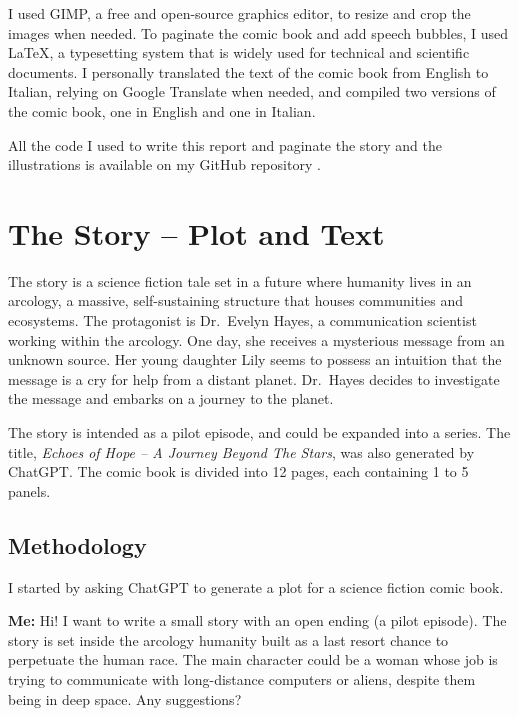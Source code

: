 \documentclass[a4paper,11pt]{article}
\newenvironment{shadedquotation1}
    {\colorlet{shadecolor}{JungleGreen!15}\begin{shaded*}
    \quoting[leftmargin=0cm, rightmargin=0cm, vskip=0pt]
    }
    {\endquoting
    \end{shaded*}
}
\begin{document}
I used GIMP, a free and open-source graphics editor, to resize and crop the images when needed. To paginate the comic book and add speech bubbles, I used \LaTeX, a typesetting system that is widely used for technical and scientific documents. I personally translated the text of the comic book from English to Italian, relying on Google Translate when needed, and compiled two versions of the comic book, one in English and one in Italian. 

All the code I used to write this report and paginate the story and the illustrations is available on my GitHub repository \cite{github}.



\section{The Story -- Plot and Text}

The story is a science fiction tale set in a future where humanity lives in an arcology, a massive, self-sustaining structure that houses communities and ecosystems. The protagonist is Dr.~Evelyn Hayes, a communication scientist working within the arcology. One day, she receives a mysterious message from an unknown source. Her young daughter Lily seems to possess an intuition that the message is a cry for help from a distant planet. Dr.~Hayes decides to investigate the message and embarks on a journey to the planet. 

The story is intended as a pilot episode, and could be expanded into a series. The title, \emph{Echoes of Hope -- A Journey Beyond The Stars}, was also generated by ChatGPT. The comic book is divided into 12 pages, each containing 1 to 5 panels.

\subsection{Methodology} 
I started by asking ChatGPT to generate a plot for a science fiction comic book. 

\begin{shadedquotation1}
    \noindent\textbf{Me:} Hi! I want to write a small story with an open ending (a pilot episode). The story is set inside the arcology humanity built as a last resort chance to perpetuate the human race. The main character could be a woman whose job is trying to communicate with long-distance computers or aliens, despite them being in deep space. Any suggestions?
\end{shadedquotation1}
\end{document}
